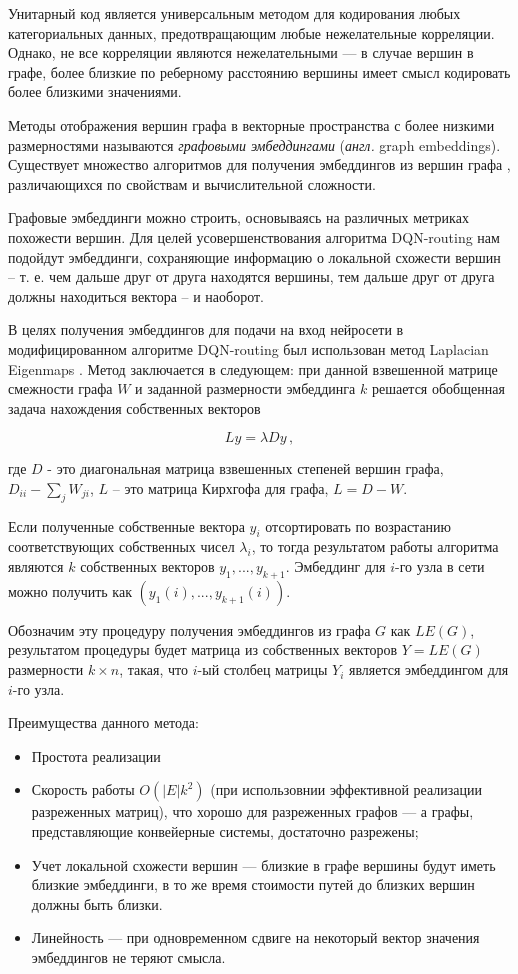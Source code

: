 \documentclass[specification,annotation,times]{itmo-student-thesis}
\theoremstyle{definition}
\begin{document}
Унитарный код является универсальным методом для кодирования любых
категориальных данных, предотвращающим любые нежелательные корреляции. Однако,
не все корреляции являются нежелательными --- в случае вершин в графе, более близкие
по реберному расстоянию вершины имеет смысл кодировать более близкими
значениями.

Методы отображения вершин графа в векторные пространства с более низкими
размерностями называются \textit{графовыми эмбеддингами} (\textit{англ.} graph
embeddings). Существует множество алгоритмов для получения эмбеддингов из вершин
графа \cite{cai2018comprehensive, goyal2018graph}, различающихся по свойствам и
вычислительной сложности. 

Графовые эмбеддинги можно строить, основываясь на различных метриках похожести
вершин. Для целей усовершенствования алгоритма DQN-routing нам подойдут эмбеддинги,
сохраняющие информацию о локальной схожести вершин -- т. е. чем дальше друг от
друга находятся вершины, тем дальше друг от друга должны находиться вектора -- и
наоборот.

В целях получения эмбеддингов для подачи на вход нейросети в модифицированном
алгоритме DQN-routing был использован метод Laplacian Eigenmaps
\cite{belkin2002laplacian}. Метод заключается в следующем: при данной взвешенной
матрице смежности графа $W$ и заданной размерности эмбеддинга $k$ решается
обобщенная задача нахождения собственных векторов

\begin{equation}\label{eqs:lap}
  L y = \lambda D y \,,
\end{equation}

где $D$ - это диагональная матрица взвешенных степеней вершин графа,
$D_{ii}-\sum_j W_{ji}$, $L$ -- это матрица Кирхгофа для графа, $L = D - W$.

Если полученные собственные вектора $y_i$ отсортировать по возрастанию
соответствующих собственных чисел $\lambda_i$, то тогда результатом работы
алгоритма являются $k$ собственных векторов $y_1, ..., y_{k+1}$.
Эмбеддинг для $i$-го узла в сети можно получить как
$(y_1(i), ..., y_{k+1}(i))$.

Обозначим эту процедуру получения эмбеддингов из графа $G$ как $LE(G)$,
результатом процедуры будет матрица из собственных векторов $Y = LE(G)$
размерности $k \times n$, такая, что $i$-ый столбец матрицы $Y_i$ является
эмбеддингом для $i$-го узла.

Преимущества данного метода:
\begin{itemize}
\item Простота реализации
\item Скорость работы $O(|E|k^2)$ \cite{goyal2018graph} (при использовнии
  эффективной реализации разреженных матриц), что хорошо для разреженных графов
  --- а графы, представляющие конвейерные системы, достаточно разрежены;
\item Учет локальной схожести вершин --- близкие в графе вершины будут иметь
  близкие эмбеддинги, в то же время стоимости путей до близких вершин должны
  быть близки.
\item Линейность --- при одновременном сдвиге на некоторый вектор значения
  эмбеддингов не теряют смысла.
\end{itemize}
\end{document}
